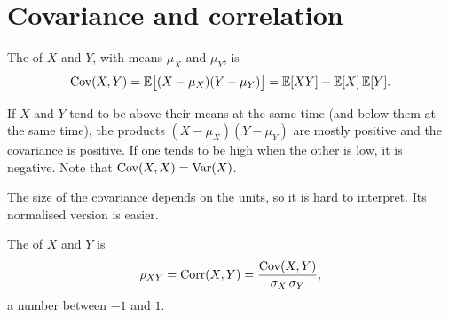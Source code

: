 \section{Covariance and correlation}\label{sec:covariance}

\begin{definition}[Covariance]\label{def:covariance}
The  of $X$ and $Y$, with means $\mu_X$ and $\mu_Y$, is
\[
  \operatorname{Cov}(X, Y) = \mathbb{E}\bigl[(X - \mu_X)(Y - \mu_Y)\bigr] = \mathbb{E}[XY] - \mathbb{E}[X]\,\mathbb{E}[Y].
\]
\end{definition}

If $X$ and $Y$ tend to be above their means at the same time (and below them at
the same time), the products $(X - \mu_X)(Y - \mu_Y)$ are mostly positive and the
covariance is positive. If one tends to be high when the other is low, it is
negative. Note that $\operatorname{Cov}(X, X) = \operatorname{Var}(X)$.

The size of the covariance depends on the units, so it is hard to interpret. Its
normalised version is easier.

\begin{definition}[Correlation]\label{def:correlation}
The  of $X$ and $Y$ is
\[
  \rho_{XY} = \operatorname{Corr}(X, Y) = \frac{\operatorname{Cov}(X, Y)}{\sigma_X\,\sigma_Y},
\]
a number between $-1$ and $1$.
\end{definition}

